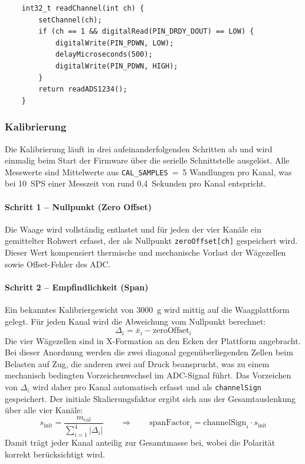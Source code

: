 \documentclass[12pt,a4paper]{article}
\begin{document}
	\begin{verbatim}
	int32_t readChannel(int ch) {
	    setChannel(ch);
	    if (ch == 1 && digitalRead(PIN_DRDY_DOUT) == LOW) {
	        digitalWrite(PIN_PDWN, LOW);
	        delayMicroseconds(500);
	        digitalWrite(PIN_PDWN, HIGH);
	    }
	    return readADS1234();
	}
	\end{verbatim}

	\subsubsection{Kalibrierung}

	Die Kalibrierung läuft in drei aufeinanderfolgenden Schritten ab und wird einmalig beim Start der Firmware über die serielle Schnittstelle ausgelöst.
	Alle Messwerte sind Mittelwerte aus \texttt{CAL\_SAMPLES}~=~5 Wandlungen pro Kanal, was bei 10~SPS einer Messzeit von rund 0,4~Sekunden pro Kanal entspricht.

	\paragraph{Schritt 1 -- Nullpunkt (Zero Offset)}
	Die Waage wird vollständig entlastet und für jeden der vier Kanäle ein gemittelter Rohwert erfasst, der als Nullpunkt \texttt{zeroOffset[ch]} gespeichert wird.
	Dieser Wert kompensiert thermische und mechanische Vorlast der Wägezellen sowie Offset-Fehler des ADC.

	\paragraph{Schritt 2 -- Empfindlichkeit (Span)}
	Ein bekanntes Kalibriergewicht von \SI{3000}{\gram} wird mittig auf die Waagplattform gelegt.
	Für jeden Kanal wird die Abweichung vom Nullpunkt berechnet:
	\begin{equation}
		\Delta_i = \overline{x}_i - \text{zeroOffset}_i
	\end{equation}
	Die vier Wägezellen sind in X-Formation an den Ecken der Plattform angebracht.
	Bei dieser Anordnung werden die zwei diagonal gegenüberliegenden Zellen beim Belasten auf Zug, die anderen zwei auf Druck beansprucht, was zu einem mechanisch bedingten Vorzeichenwechsel im ADC-Signal führt.
	Das Vorzeichen von $\Delta_i$ wird daher pro Kanal automatisch erfasst und als \texttt{channelSign} gespeichert.
	Der initiale Skalierungsfaktor ergibt sich aus der Gesamtauslenkung über alle vier Kanäle:
	\begin{equation}
		s_{\text{init}} = \frac{m_{\text{cal}}}{\sum_{i=1}^{4} |\Delta_i|}
		\qquad \Rightarrow \qquad
		\text{spanFactor}_i = \text{channelSign}_i \cdot s_{\text{init}}
	\end{equation}
	Damit trägt jeder Kanal anteilig zur Gesamtmasse bei, wobei die Polarität korrekt berücksichtigt wird.
\end{document}
